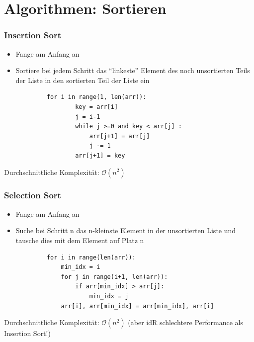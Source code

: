 \documentclass{beamer}
\begin{document}
	\section[Sortieralgorithmus]{Algorithmen: Sortieren}
	\begin{frame}[fragile]
		\frametitle{Insertion Sort}
		\begin{itemize}
			\item Fange am Anfang an
			\item Sortiere bei jedem Schritt das “linkeste” Element des noch unsortierten Teils der Liste in den sortierten Teil der Liste ein\pause
		\end{itemize}
		\begin{lstlisting}
			for i in range(1, len(arr)): 
    				key = arr[i] 
    				j = i-1
    				while j >=0 and key < arr[j] : 
    					arr[j+1] = arr[j] 
    					j -= 1
    				arr[j+1] = key 
		\end{lstlisting}\pause
		Durchschnittliche Komplexität: \(\mathcal{O}(n^2)\)
	\end{frame}
	\begin{frame}[fragile]
		\frametitle{Selection Sort}
		\begin{itemize}
			\item Fange am Anfang an
			\item Suche bei Schritt n das n-kleinste Element in der unsortierten Liste und tausche dies mit dem Element auf Platz n\pause
		\end{itemize}
		\begin{lstlisting}
			for i in range(len(arr)):
				min_idx = i 
				for j in range(i+1, len(arr)): 
					if arr[min_idx] > arr[j]: 
						min_idx = j 
				arr[i], arr[min_idx] = arr[min_idx], arr[i] 
		\end{lstlisting}\pause
		Durchschnittliche Komplexität: \(\mathcal{O}(n^2)\) (aber idR schlechtere Performance als Insertion Sort!)
	\end{frame}
\end{document}
